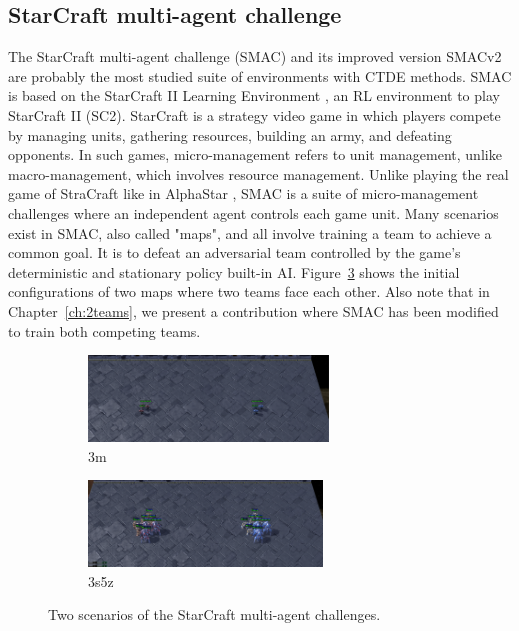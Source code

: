 \subsection{StarCraft multi-agent challenge} \label{sec:ch3_smac}
The StarCraft multi-agent challenge (SMAC) \citep{samvelyan2019starcraft} and its improved version SMACv2 \citep{ellis2023smacv2} are probably the most studied suite of environments with CTDE methods.
SMAC is based on the StarCraft II Learning Environment \citep{vinyals2017starcraft}, an RL environment to play StarCraft II (SC2).
StarCraft is a strategy video game in which players compete by managing units, gathering resources, building an army, and defeating opponents.
In such games, micro-management refers to unit management, unlike macro-management, which involves resource management.
Unlike playing the real game of StraCraft like in AlphaStar \citep{vinyals2019grandmaster}, SMAC is a suite of micro-management challenges where an independent agent controls each game unit.
Many scenarios exist in SMAC, also called "maps", and all involve training a team to achieve a common goal.
It is to defeat an adversarial team controlled by the game's deterministic and stationary policy built-in AI.
Figure~\ref{fig:ch3_smac} shows the initial configurations of two maps where two teams face each other.
Also note that in Chapter~\ref{ch:2teams}, we present a contribution where SMAC has been modified to train both competing teams.

\begin{figure}
     \centering
     \begin{subfigure}[b]{0.5\textwidth}
         \centering
         \includegraphics[height=2.3cm]{tex_thesis/figures/ch3/3m_screen.pdf}
         \caption{3m}
         \label{fig:ch3_3m}
     \end{subfigure}%
     \begin{subfigure}[b]{0.5\textwidth}
         \centering
         \includegraphics[height=2.3cm]{tex_thesis/figures/ch3/3s5z_screen.pdf}
         \caption{3s5z}
         \label{fig:ch3_3s5z}
     \end{subfigure}
    \caption{Two scenarios of the StarCraft multi-agent challenges.}
    \label{fig:ch3_smac}
\end{figure}

